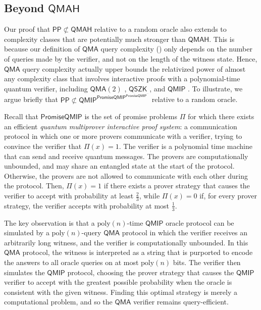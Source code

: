 \documentclass[10pt,a4paper]{article}
\newcommand{\poly}{\mathrm{poly}}
\begin{document}
\subsection{Beyond \texorpdfstring{$\mathsf{QMAH}$}{QMAH}}
Our proof that $\mathsf{PP} \not\subset \mathsf{QMAH}$ relative to a random oracle also extends to complexity classes that are potentially much stronger than $\mathsf{QMAH}$. This is because our definition of $\mathsf{QMA}$ query complexity () only depends on the number of queries made by the verifier, and not on the length of the witness state. Hence, $\mathsf{QMA}$ query complexity actually upper bounds the relativized power of almost any complexity class that involves interactive proofs with a polynomial-time quantum verifier, including $\mathsf{QMA}(2)$ \cite{KMY03}, $\mathsf{QSZK}$ \cite{Wat02}, and $\mathsf{QMIP}$ \cite{KM02}. To illustrate, we argue briefly that $\mathsf{PP} \not\subset \mathsf{QMIP}^{\mathsf{PromiseQMIP}^{\mathsf{PromiseQMIP}^{\cdots}}}$ relative to a random oracle.

Recall that $\mathsf{PromiseQMIP}$ is the set of promise problems $\Pi$ for which there exists an efficient \textit{quantum multiprover interactive proof system}: a communication protocol in which one or more provers communicate with a verifier, trying to convince the verifier that $\Pi(x) = 1$. The verifier is a polynomial time machine that can send and receive quantum messages. The provers are computationally unbounded, and may share an entangled state at the start of the protocol. Otherwise, the provers are not allowed to communicate with each other during the protocol. Then, $\Pi(x) = 1$ if there exists a prover strategy that causes the verifier to accept with probability at least $\frac{2}{3}$, while $\Pi(x) = 0$ if, for every prover strategy, the verifier accepts with probability at most $\frac{1}{3}$.

The key observation is that a $\poly(n)$-time $\mathsf{QMIP}$ oracle protocol can be simulated by a $\poly(n)$-query $\mathsf{QMA}$ protocol in which the verifier receives an arbitrarily long witness, and the verifier is computationally unbounded. In this $\mathsf{QMA}$ protocol, the witness is interpreted as a string that is purported to encode the answers to all oracle queries on at most $\poly(n)$ bits. The verifier then simulates the $\mathsf{QMIP}$ protocol, choosing the prover strategy that causes the $\mathsf{QMIP}$ verifier to accept with the greatest possible probability when the oracle is consistent with the given witness. Finding this optimal strategy is merely a computational problem, and so the $\mathsf{QMA}$ verifier remains query-efficient.
\end{document}

